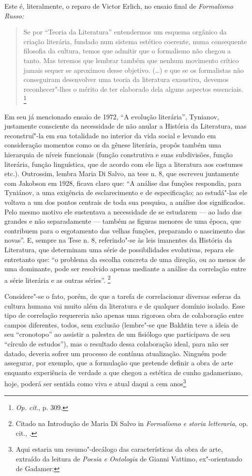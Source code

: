 {Este é, literalmente, o reparo de Victor Erlich, no ensaio final de
\emph{Formalismo Russo:}

\begin{quote}
Se por ``Teoria da Literatura'' entendermos um esquema orgânico da
criação literária, fundado num sistema estético coerente, numa
consequente filosofia da cultura, temos que admitir que o formalismo não
chegou a tanto. Mas teremos que lembrar também que nenhum movimento
crítico jamais sequer se aproximou desse objetivo. (\ldots{}) e que se os
formalistas não conseguiram desenvolver uma teoria da literatura
exaustiva, devemos reconhecer"-lhes o mérito de ter elaborado dela alguns
aspectos essenciais. \footnote{\emph{Op. cit}., p. 309.}
\end{quote}

Em seu já mencionado ensaio de 1972, ``A evolução literária'', Tynianov,
justamente consciente da necessidade de não anular a História da
Literatura, mas reconstruí"-la em sua totalidade no interior da vida
social e levando em consideração momentos como os da gênese literária,
propôs também uma hierarquia de níveis funcionais (função construtiva e
suas subdivisões, função literária, função linguística, que de acordo
com ele liga a literatura aos costumes etc.). Outrossim, lembra Maria Di
Salvo, na tese n. 8, que escreveu juntamente com Jakobson em 1928,
ficava claro que: ``A análise das funções respondia, para Tyniánov, a
uma exigência de esclarecimento e de especificação; ao estudá"-las ele
voltava a um dos pontos centrais de toda sua pesquisa, a análise dos
significados. Pelo mesmo motivo ele sustentava a necessidade de se
estudarem --- ao lado das grandes e não separadamente --- também as figuras
menores de uma época, que contribuem para o esgotamento das velhas
funções, preparando o nascimento das novas''. E, sempre na Tese n. 8,
referindo"-se às leis imanentes da História da Literatura, que determinam
uma série de possibilidades evolutivas, repara ele entretanto que: ``o
problema da escolha concreta de uma direção, ou ao menos de uma
dominante, pode ser resolvido apenas mediante a análise da correlação
entre a série literária e as outras séries''.
\footnote{Citado na Introdução de Maria Di Salvo in \emph{Formalismo e
  storia letteraria}, op. cit., .}

Considere"-se o fato, porém, de que a tarefa de correlacionar diversas
esferas da cultura humana vai muito além da literatura e de qualquer
domínio isolado. Esse tipo de correlação requereria não apenas uma
rigorosa obra de colaboração entre campos diferentes, todos, sem
exclusão (lembre"-se que Bakhtin teve a ideia de seu ``cronotopo'' ao
assistir a palestra de um fisiólogo que participava de seu ``círculo de
estudos''), mas o resultado dessa colaboração ideal, para não ser
datado, deveria sofrer um processo de contínua atualização. Ninguém pode
assegurar, por exemplo, que a formulação que pretende definir a obra de
arte enquanto experiência de verdade a que chegou a estética de cunho
gadameriano, hoje, poderá ser sentida como viva e atual daqui a cem
anos\footnote{Aqui estaria um resumo"-decálogo das características da
  obra de arte, extraído da leitura de \emph{Poesia e Ontologia} de
  Gianni Vattimo, ex"-orientando de Gadamer:

}}
